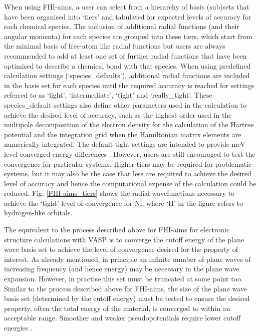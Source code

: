 \documentclass[11pt, twoside]{report}
\begin{document}
When using FHI-aims, a user can select from a hierarchy of basis (sub)sets that have been organised into `tiers' and tabulated for expected levels of accuracy for each chemical species. The inclusion of additional radial functions (and their angular momenta) for each species are grouped into these tiers, which start from the minimal basis of free-atom like radial functions but users are always recommended to add at least one set of further radial functions that have been optimised to describe a chemical bond with that species.  When using predefined calculation settings (`species\_defaults'), additional radial functions are included in the basis set for each species until the required accuracy is reached for settings referred to as `light', `intermediate', `tight' and `really\_tight'. These species\_default settings also define other parameters used in the calculation to achieve the desired level of accuracy, such as the highest order used in the multipole decomposition of the electron density for the calculation of the Hartree potential and the integration grid when the Hamiltonian matrix elements are numerically integrated. The default tight settings are intended to provide meV-level converged energy differences \cite{FHI-aims_manual}. However, users are still encouraged to test the convergence for particular systems. Higher tiers may be required for problematic systems, but it may also be the case that less are required to achieve the desired level of accuracy and hence the computational expense of the calculation could be reduced. Fig. \ref{FHI-aims_tiers} shows the radial wavefunctions necessary to achieve the `tight' level of convergence for Ni, where `H' in the figure refers to hydrogen-like orbitals. 

The equivalent to the process described above for FHI-aims for electronic structure calculations with VASP is to converge the cutoff energy of the plane wave basis set to achieve the level of convergence desired for the property of interest. As already mentioned, in principle an infinite number of plane waves of increasing frequency (and hence energy) may be necessary in the plane wave expansion. However, in practise this set must be truncated at some point too. Similar to the process described above for FHI-aims, the size of the plane wave basis set (determined by the cutoff energy) must be tested to ensure the desired property, often the total energy of the material, is converged to within an acceptable range. Smoother and weaker pseudopotentials require lower cutoff energies \cite{Prasad_ch6}.
\end{document}
